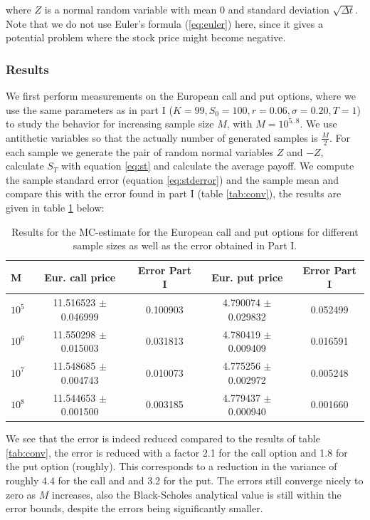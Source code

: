 \documentclass[11pt,a4paper]{article}
\begin{document}
where $Z$ is a normal random variable with mean 0 and standard deviation $\sqrt{\Delta t}$. Note that we do not use Euler's formula (\ref{eq:euler}) here, since it gives a potential problem where the stock price might become negative.

\subsubsection{Results}
We first perform measurements on the European call and put options, where we use the same parameters as in part I ($K = 99, S_0 = 100, r = 0.06, \sigma = 0.20, T = 1$) to study the behavior for increasing sample size $M$, with $M = 10^{5..8}$. We use antithetic variables so that the actually number of generated samples is $\frac{M}{2}$. For each sample we generate the pair of random normal variables $Z$ and $-Z$, calculate $S_T$ with equation \ref{eq:st} and calculate the average payoff. We compute the sample standard error (equation \ref{eq:stderror}) and the sample mean and compare this with the error found in part I (table \ref{tab:conv}), the results are given in table \ref{tab:anti} below: 

\begin{table}[H]
  \centering
  \begin{tabular}{l || c | c | c | c}
    \hline
    M & Eur. call price & Error Part I & Eur. put price & Error Part I \\
    \hline
    $10^5$ & 11.516523 $\pm$ 0.046999 & 0.100903 & 4.790074 $\pm$ 0.029832 & 0.052499 \\
    $10^6$ & 11.550298 $\pm$ 0.015003 & 0.031813 & 4.780419 $\pm$ 0.009409 & 0.016591 \\
    $10^7$ & 11.548685 $\pm$ 0.004743 & 0.010073 & 4.775256 $\pm$ 0.002972 & 0.005248 \\
    $10^8$ & 11.544653 $\pm$ 0.001500 & 0.003185 & 4.779437 $\pm$ 0.000940 & 0.001660 \\
  \end{tabular}
  \caption{Results for the MC-estimate for the European call and put options for different sample sizes as well as the error obtained in Part I.}
  \label{tab:anti}
\end{table}

We see that the error is indeed reduced compared to the results of table \ref{tab:conv}, the error is reduced with a factor 2.1 for the call option and 1.8 for the put option (roughly). This corresponds to a reduction in the variance of roughly 4.4 for the call and and 3.2 for the put. The errors still converge nicely to zero as $M$ increases, also the Black-Scholes analytical value is still within the error bounds, despite the errors being significantly smaller.
\end{document}

